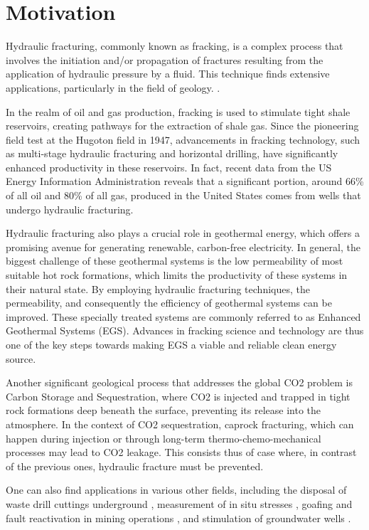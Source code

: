 \section{Motivation}

Hydraulic fracturing, commonly known as fracking, is a complex process that involves the initiation and/or propagation of fractures resulting from the application of hydraulic pressure by a fluid. This technique finds extensive applications, particularly in the field of geology. \cite{adachi2007computer}.

In the realm of oil and gas production, fracking is used to stimulate tight shale reservoirs, creating pathways for the extraction of shale gas. Since the pioneering field test at the Hugoton field in 1947, advancements in fracking technology, such as multi-stage hydraulic fracturing and horizontal drilling, have significantly enhanced productivity in these reservoirs. In fact, recent data from the US Energy Information Administration\cite{eia_data_on_gas, eia_data_on_oil} reveals that a significant portion, around 66\% of all oil and 80\% of all gas, produced in the United States comes from wells that undergo hydraulic fracturing.

Hydraulic fracturing also plays a crucial role in geothermal energy, which offers a promising avenue for generating renewable, carbon-free electricity. In general, the biggest challenge of these geothermal systems is the low permeability of most suitable hot rock formations, which limits the productivity of these systems in their natural state. By employing hydraulic fracturing techniques, the permeability, and consequently the efficiency of geothermal systems can be improved. These specially treated systems are commonly referred to as Enhanced Geothermal Systems (EGS). Advances in fracking science and technology are thus one of the key steps towards making EGS a viable and reliable clean energy source.

Another significant geological process that addresses the global CO2 problem is Carbon Storage and Sequestration, where CO2 is injected and trapped in tight rock formations deep beneath the surface, preventing its release into the atmosphere. In the context of CO2 sequestration, caprock fracturing, which can happen during injection or through long-term thermo-chemo-mechanical processes may lead to CO2 leakage.\cite{pan2014tough} This consists thus of case where, in contrast of the previous ones, hydraulic fracture must be prevented. 

One can also find applications in various other fields, including the disposal of waste drill cuttings underground \cite{moschovidis_mounds_2000}, measurement of in situ stresses \cite{desroches_stress_1995, desroches1993modelling}, goafing and fault reactivation in mining operations \cite{board_fluid_1992, zhang_propagation_2002}, and stimulation of groundwater wells \cite{noauthor_permeability_nodate,less_hydrofracture_1994}.

